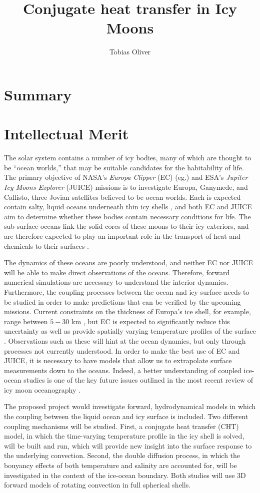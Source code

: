 \documentclass{article}
\title{Conjugate heat transfer in Icy Moons}
\author{Tobias Oliver}
\date{}
\begin{document}
\maketitle
\section{Summary}
\section{Intellectual Merit}
The solar system contains a number of icy bodies, many of which are thought to be ``ocean worlds,'' that may be suitable candidates for the habitability of life.
The primary objective of NASA's \textit{Europa Clipper} (EC) (eg.\citep{pC14_JUICE}) and ESA's \textit{Jupiter Icy Moons Explorer} (JUICE)\citep{oG13} missions is to investigate Europa, Ganymede, and Callisto, three Jovian satellites believed to be ocean worlds. Each is expected contain salty, liquid oceans underneath thin icy shells \citep{rP99,fN16}, and both EC and JUICE aim to determine whether these bodies contain necessary conditions for life\citep{tB24}.
The sub-surface oceans link the solid cores of these moons to their icy exteriors, and are therefore expected to play an important role in the transport of heat and chemicals to their surfaces \citep{kS20}. 

The dynamics of these oceans are poorly understood, and neither EC nor JUICE will be able to make direct observations of the oceans. 
Therefore, forward numerical simulations are necessary to understand the interior dynamics. 
Furthermore, the coupling processes between the ocean and icy surface needs to be studied in order to make predictions that can be verified by the upcoming missions.
Current constraints on the thickness of Europa's ice shell, for example, range between $5-30$ km \citep{sV18}, but EC is expected to significantly reduce this uncertainty as well as provide spatially varying temperature profiles of the surface \citep{kS20}. 
Observations such as these will hint at the ocean dynamics, but only through processes not currently understood. In order to make the best use of EC and JUICE, it is necessary to have models that allow us to extrapolate surface measurements down to the oceans.
Indeed, a better understanding of coupled ice-ocean studies is one of the key future issues outlined in the most recent review of icy moon oceanography \citep{kS24}. 

The proposed project would investigate forward, hydrodynamical models in which the coupling between the liquid ocean and icy surface is included. Two different coupling mechanisms will be studied. 
First, a conjugate heat transfer (CHT) model, in which the time-varying temperature profile in the icy shell is solved, will be built and run, which will provide new insight into the surface response to the underlying convection. Second, the double diffusion process, in which the bouyancy effects of both temperature and salinity are accounted for, will be investigated in the context of the ice-ocean boundary. Both studies will use 3D forward models of rotating convection in full spherical shells. 
\end{document}
